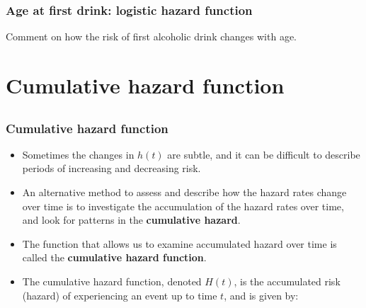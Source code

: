 \begin{frame}
\frametitle{Age at first drink: logistic hazard function}
Comment on how the risk of first alcoholic drink changes with age.
\vskip150pt
\end{frame}

\section[Cumulative hazard function]{Cumulative hazard function}
\subsection{}
\begin{frame}
\end{frame}

\begin{frame}
\frametitle{Cumulative hazard function}
\begin{itemize}
\item Sometimes the changes in $h(t)$ are subtle, and it can be difficult to describe periods of increasing and decreasing risk. %

\item An alternative method to assess and describe how the hazard rates change over time is to
investigate the accumulation of the hazard rates over time, and look for patterns in
the \textbf{cumulative hazard}.

\item The function that allows us to examine accumulated hazard over time is called the \textbf{cumulative hazard function}.

\item The cumulative hazard function, denoted $H(t)$, is the accumulated
risk (hazard) of experiencing an event up to time $t$, and is given
by:
\end{itemize}
\vskip50pt
\end{frame}

